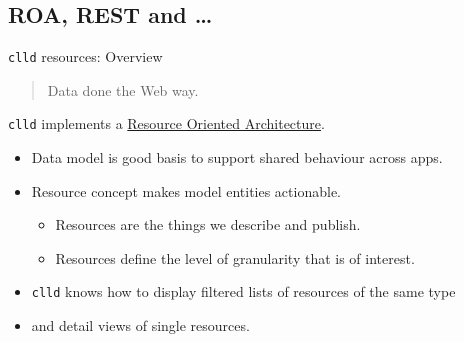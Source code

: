 \documentclass{beamer}
\begin{document}



%
%

\subsection{ROA, REST and \dots}

\begin{frame}{\texttt{clld} resources: Overview}
\begin{quote}
Data done the Web way.
\end{quote}

\texttt{clld} implements a
\href{http://en.wikipedia.org/wiki/Resource-oriented_architecture}{Resource Oriented Architecture}.

\begin{itemize}
\item Data model is good basis to support shared behaviour across apps.
\item Resource concept makes model entities actionable.
\begin{itemize}
\item Resources are the things we describe and publish.
\item Resources define the level of granularity that is of interest.
\end{itemize}
\item \texttt{clld} knows how to display filtered lists of resources of the same type
\item and detail views of single resources.
\end{itemize}
\end{frame}
\end{document}
